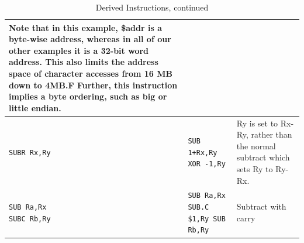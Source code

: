 \documentclass{gqtekspec}
\begin{document}
\begin{table}
\begin{center}
\begin{tabular}{p{1.4in}p{1.5in}p{3in}}
{	Note that in this example, \$addr is a
	byte-wise address, whereas in all of our other examples it is a 
	32-bit word address. This also limits the address space
	of character accesses from 16 MB down to 4MB.F
	Further, this instruction implies a byte ordering,
	such as big or little endian.} \\\hline
{\tt SUBR Rx,Ry }
	& \parbox[t]{1.5in}{\tt SUB 1+Rx,Ry\\ XOR -1,Ry} 
	& Ry is set to Rx-Ry, rather than the normal subtract which
	sets Ry to Ry-Rx. \\\hline
\parbox[t]{1.4in}{\tt SUB Ra,Rx\\SUBC Rb,Ry}
	& \parbox[t]{1.5in}{\tt SUB Ra,Rx\\SUB.C \$1,Ry\\SUB Rb,Ry}
	& Subtract with carry \\\hline
\end{tabular}
\caption{Derived Instructions, continued}\label{tbl:derived-3}
\end{center}\end{table}
\end{document}
